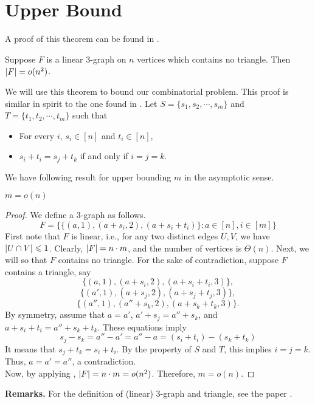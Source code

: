 \section{Upper Bound}

A proof of this theorem can be found in \cite{EFR86}.
\begin{theorem} 
	\label{thm:RS}
	Suppose $ F $ is a linear 3-graph on $ n $ vertices which contains no triangle. Then $ \left\vert{F}\right\vert = o(n^2) $. 
\end{theorem}

\noindent We will use this theorem to bound our combinatorial problem. This proof is similar in spirit to the one found in \cite{FGV87}. Let $ S = \{s_1, s_2, \cdots, s_m\} $ and $ T =\{ t_1,t_2, \cdots, t_m\} $ such that 
\begin{itemize}
	\item For every $ i $, $ s_i \in [n] $ and $ t_i \in [n] $,
	\item $ s_i + t_i = s_j + t_k $  if and only if $ i = j = k $.
\end{itemize}
We have following result for upper bounding $ m $ in the asymptotic sense. 
\begin{theorem}
	$ m = o(n) $
\end{theorem}  

\begin{proof}
	We define a 3-graph as follows. 
	$$ F = \{ \{(a,1), (a+s_i, 2), (a + s_i + t_i)\} : a \in [n], i \in [m] \} $$
	First note that $ F $ is linear, i.e., for any two distinct edges $ U,V $, we have $ \left\vert{U \cap V}\right\vert \leqslant 1 $. Clearly, $ \left\vert{F}\right\vert = n \cdot m$, and the number of vertices is $ \Theta(n) $. Next, we will so that $ F $ contains no triangle. For the sake of contradiction, suppose $ F $ contains a triangle, say
	$$  \{ (a, 1), (a+s_i, 2), (a+ s_i + t_i, 3)\}, $$
	$$ \{ (a', 1), (a+s_j, 2), (a+ s_j + t_j, 3)\}, $$
	$$ \{ (a'', 1), (a''+s_k, 2), (a+ s_k + t_k, 3)\}. $$
	By symmetry, assume that $ a = a'$, $a' + s_j = a'' + s_k$, and $a + s_i+ t_i = a'' + s_k + t_k $.
	These equations imply
	$$ s_j - s_k = a'' - a' = a'' - a = (s_i + t_i) - (s_k + t_k)$$
	It means that $ s_j + t_k = s_i + t_i $. By the property of $ S $ and $ T $, this implies $  i = j = k $. Thus, $ a = a' = a'' $, a contradiction.\\
	Now, by applying , $ \left\vert{F}\right\vert = n \cdot m = o(n^2) $. Therefore, $ m = o(n) $. 
\end{proof}

\noindent \textbf{Remarks.} For the definition of (linear) 3-graph and triangle, see the paper \cite{FGV87}.

